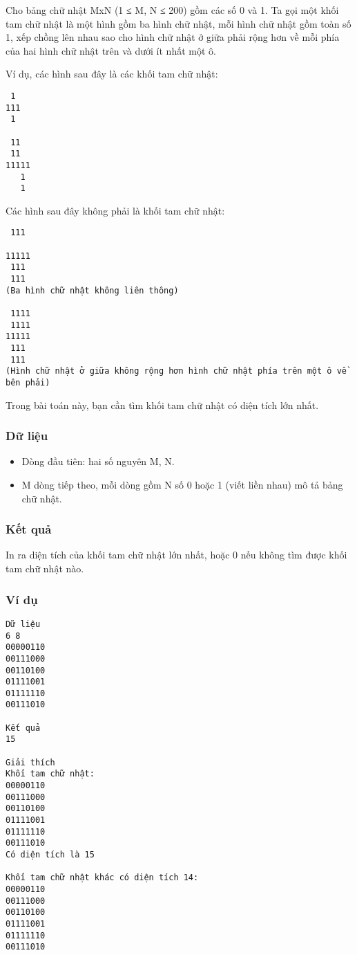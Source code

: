 



   Cho bảng chữ nhật MxN (1 ≤ M, N ≤ 200) gồm các số 0 và 1. Ta gọi một       khối tam chữ nhật      là một hình gồm ba hình chữ nhật, mỗi hình chữ nhật gồm toàn số 1, xếp chồng lên nhau sao cho hình chữ nhật ở giữa phải rộng hơn về mỗi phía của hai hình chữ nhật trên và dưới ít nhất một ô.  

   Ví dụ, các hình sau đây là các khối tam chữ nhật:  
\begin{verbatim}
 1	
111
 1	
 
 11		
 11		
11111
   1		
   1		
\end{verbatim}

   Các hình sau đây không phải là khối tam chữ nhật:  
\begin{verbatim}
 111
	 				
11111
 111	
 111	
(Ba hình chữ nhật không liên thông)

 1111
 1111
11111
 111	
 111	
(Hình chữ nhật ở giữa không rộng hơn hình chữ nhật phía trên một ô về bên phải)
\end{verbatim}

   Trong bài toán này, bạn cần tìm khối tam chữ nhật có diện tích lớn nhất.  

\subsubsection{   Dữ liệu  }
\begin{itemize}
	\item     Dòng đầu tiên: hai số nguyên M, N.   
	\item     M dòng tiếp theo, mỗi dòng gồm N số 0 hoặc 1 (viết liền nhau) mô tả bảng chữ nhật.    


\end{itemize}

\subsubsection{   Kết quả  }

   In ra diện tích của khối tam chữ nhật lớn nhất, hoặc 0 nếu không tìm được khối tam chữ nhật nào.  

\subsubsection{   Ví dụ  }
\begin{verbatim}
Dữ liệu
6 8
00000110
00111000
00110100
01111001
01111110
00111010

Kết quả
15

Giải thích
Khối tam chữ nhật:
00000110
00111000
00110100
01111001
01111110
00111010  
Có diện tích là 15

Khối tam chữ nhật khác có diện tích 14:
00000110
00111000
00110100
01111001
01111110
00111010 
\end{verbatim}